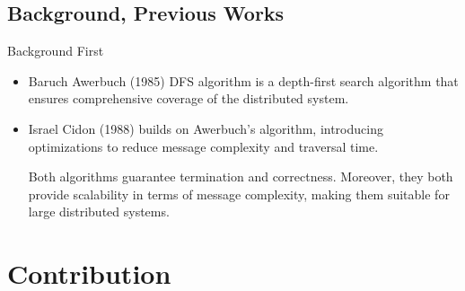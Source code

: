 \documentclass[11pt]{beamer}              %
\begin{document}

\subsection{Background, Previous Works}
\begin{frame}{Background}
First
\begin{itemize}

\item Baruch Awerbuch (1985) DFS algorithm is a depth-first search algorithm that ensures comprehensive coverage of the distributed system.

\item Israel Cidon (1988) builds on Awerbuch's algorithm, introducing optimizations to reduce message complexity and traversal time.

Both algorithms guarantee termination and correctness. Moreover, they both provide scalability in terms of message complexity, making them suitable for large distributed systems.
\end{itemize}

\end{frame}




\section{Contribution}
\end{document}
